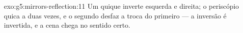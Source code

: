 \begin{solution}{exo:g5:mirrors-reflection:11}
Um quique inverte esquerda e direita; o periscópio quica a  duas
vezes, e o segundo  desfaz a troca do primeiro --- a inversão
é invertida, e a cena chega no sentido certo.
\end{solution}
